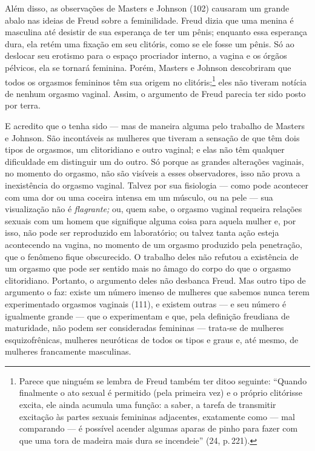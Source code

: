  Além disso, as observações de Masters\idxmaste{} e Johnson\idxjohns{} (102) causaram um
grande abalo nas ideias de Freud sobre a feminilidade. Freud dizia que
uma menina é masculina até desistir de sua esperança de ter um pênis;
enquanto essa esperança dura, ela retém uma fixação em seu clitóris,\idxfeminfixa{} como se ele fosse um pênis. Só ao deslocar seu erotismo para o espaço
procriador interno, a vagina e os órgãos pélvicos, ela se tornará
feminina. Porém, Masters e Johnson descobriram que todos os orgasmos
femininos têm sua origem no\idxclitfemi{} clitóris;\footnote{ Parece que ninguém se
lembra de Freud também ter dito\idxfreudclito[|nn] o seguinte: ``Quando
finalmente o ato sexual é permitido (pela primeira vez) e o próprio
clitóris\idxclit[|nn] se excita, ele ainda acumula uma função: a saber, a tarefa de
transmitir excitação às partes sexuais femininas adjacentes, exatamente
como --- mal comparando --- é possível acender algumas aparas de
pinho para fazer com que uma tora de madeira mais dura se
incendeie'' (24, p.\,221).} eles não tiveram notícia de
nenhum orgasmo\idxvaginorg{} vaginal. Assim, o argumento de Freud parecia ter sido
posto por terra.

 E acredito que o tenha sido --- mas de maneira alguma pelo trabalho de Masters e Johnson. São incontáveis as mulheres que tiveram a sensação de que têm dois tipos de orgasmos, um clitoridiano\idxclitorga{} e outro vaginal; e elas não têm qualquer dificuldade em distinguir um do outro. Só porque as grandes alterações vaginais, no momento do orgasmo, não são visíveis
a esses observadores, isso não prova a inexistência do orgasmo vaginal. Talvez por sua fisiologia --- como pode acontecer com uma dor ou uma coceira intensa em um músculo, ou na pele --- sua visualização não é \textit{flagrante;} ou, quem sabe, o orgasmo vaginal requeira relações sexuais com um homem que signifique alguma coisa para aquela mulher e, por isso, não pode ser reproduzido em laboratório; ou talvez tanta ação esteja acontecendo na vagina, no momento de um orgasmo produzido pela penetração, que o fenômeno fique obscurecido. O trabalho deles não refutou a existência de um orgasmo que pode ser sentido mais no âmago
do corpo do que o orgasmo clitoridiano. Portanto, o argumento deles não desbanca Freud. Mas outro tipo de argumento o faz: existe um número imenso de mulheres que sabemos nunca terem experimentado orgasmos vaginais (111), e existem outras --- e seu número é igualmente grande --- que o experimentam e que, pela definição freudiana de maturidade, não podem ser consideradas femininas --- trata-se de mulheres esquizofrênicas, mulheres neuróticas de todos os tipos e graus e, até mesmo, de mulheres francamente masculinas.

